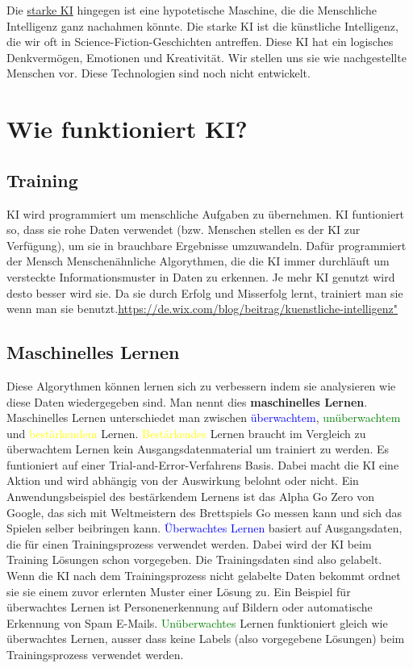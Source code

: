 \documentclass{report}
\begin{document}
Die \underline{starke KI} hingegen ist eine hypotetische Maschine, die die Menschliche Intelligenz ganz nachahmen könnte. Die starke KI ist die künstliche Intelligenz, die wir oft in Science-Fiction-Geschichten antreffen. Diese KI hat ein logisches Denkvermögen, Emotionen und Kreativität. Wir stellen uns sie wie nachgestellte Menschen vor. 
Diese Technologien sind noch nicht entwickelt.

\chapter{Wie funktioniert KI?}

\section{Training}
KI wird programmiert um menschliche Aufgaben zu übernehmen.
KI funtioniert so, dass sie rohe Daten verwendet (bzw. Menschen stellen es der KI zur Verfügung), um sie in brauchbare Ergebnisse umzuwandeln.
Dafür programmiert der Mensch Menschenähnliche Algorythmen, die die KI immer durchläuft um versteckte Informationsmuster in Daten zu erkennen.
Je mehr KI genutzt wird desto besser wird sie. Da sie durch Erfolg und Misserfolg lernt, trainiert man sie wenn man sie benutzt.\url{https://de.wix.com/blog/beitrag/kuenstliche-intelligenz"}

\section{Maschinelles Lernen}

Diese Algorythmen können lernen sich zu verbessern indem sie analysieren wie diese Daten wiedergegeben sind. Man nennt dies \textbf{maschinelles Lernen}.
Maschinelles Lernen unterschiedet man zwischen \textcolor{blue}{überwachtem}, \textcolor{green}{unüberwachtem} und \textcolor{yellow}{bestärkendem} Lernen. \textcolor{yellow}{Bestärkendes} Lernen braucht im Vergleich zu
überwachtem Lernen kein Ausgangsdatenmaterial um trainiert zu werden. Es funtioniert auf einer Trial-and-Error-Verfahrens Basis. Dabei macht die KI
eine Aktion und wird abhängig von der Auswirkung belohnt oder nicht. Ein Anwendungsbeispiel des bestärkendem Lernens ist das Alpha Go Zero von Google, das 
sich mit Weltmeistern des Brettspiels Go messen kann und sich das Spielen selber beibringen kann.
\textcolor{blue}{Überwachtes Lernen} basiert auf Ausgangsdaten, die für einen Trainingsprozess verwendet werden.\citep{bigdatainsider} Dabei wird der KI beim Training Lösungen  
schon vorgegeben. Die Trainingsdaten sind also gelabelt. Wenn die KI nach dem Trainingsprozess nicht gelabelte Daten bekommt ordnet sie sie einem zuvor erlernten
Muster einer Lösung zu. Ein Beispiel für überwachtes Lernen ist Personenerkennung auf Bildern oder automatische Erkennung von Spam E-Mails.
\textcolor{green}{Unüberwachtes} Lernen funktioniert gleich wie überwachtes Lernen, ausser dass keine Labels (also vorgegebene Lösungen) beim Trainingsprozess verwendet werden.



\nocite{*}
\printbibliography
\end{document}
